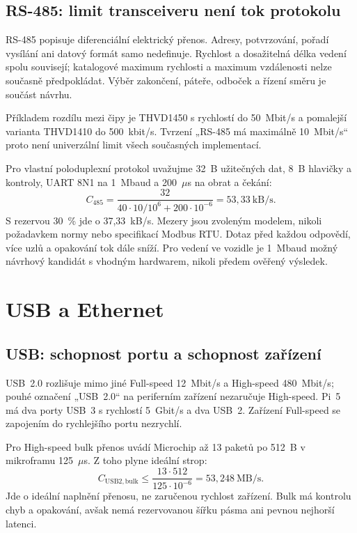 \documentclass[11pt,a4paper]{article}
\begin{document}
\subsection{RS-485: limit transceiveru není tok protokolu}
RS-485 popisuje diferenciální elektrický přenos. Adresy, potvrzování, pořadí vysílání ani datový formát samo nedefinuje. Rychlost a dosažitelná délka vedení spolu souvisejí; katalogové maximum rychlosti a maximum vzdálenosti nelze současně předpokládat. Výběr zakončení, páteře, odboček a řízení směru je součást návrhu.\cite{rs485}

Příkladem rozdílu mezi čipy je THVD1450 s rychlostí do 50~Mbit/s a pomalejší varianta THVD1410 do 500~kbit/s.\cite{thvd} Tvrzení „RS-485 má maximálně 10~Mbit/s“ proto není univerzální limit všech současných implementací.

Pro vlastní poloduplexní protokol uvažujme 32~B užitečných dat, 8~B hlavičky a kontroly, UART 8N1 na 1~Mbaud a 200~$\mu$s na obrat a čekání:
\begin{equation}
C_{\mathrm{485}}=\frac{32}{40\cdot10/10^6+200\cdot10^{-6}}
=53{,}33~\mathrm{kB/s}.
\end{equation}
S rezervou 30~\% jde o 37,33~kB/s. Mezery jsou zvoleným modelem, nikoli požadavkem normy nebo specifikací Modbus RTU. Dotaz před každou odpovědí, více uzlů a opakování tok dále sníží. Pro vedení ve vozidle je 1~Mbaud možný návrhový kandidát s vhodným hardwarem, nikoli předem ověřený výsledek.

\section{USB a Ethernet}
\label{sec:usb}
\subsection{USB: schopnost portu a schopnost zařízení}
USB~2.0 rozlišuje mimo jiné Full-speed 12~Mbit/s a High-speed 480~Mbit/s; pouhé označení „USB~2.0“ na periferním zařízení nezaručuje High-speed.\cite{usb2,usbhs} Pi~5 má dva porty USB~3 s rychlostí 5~Gbit/s a dva USB~2.\cite{pi5} Zařízení Full-speed se zapojením do rychlejšího portu nezrychlí.

Pro High-speed bulk přenos uvádí Microchip až 13 paketů po 512~B v mikroframu 125~$\mu$s. Z toho plyne ideální strop:
\begin{equation}
C_{\mathrm{USB2,bulk}}\le\frac{13\cdot512}{125\cdot10^{-6}}
=53{,}248~\mathrm{MB/s}.
\end{equation}
Jde o ideální naplnění přenosu, ne zaručenou rychlost zařízení.\cite{usbhs} Bulk má kontrolu chyb a opakování, avšak nemá rezervovanou šířku pásma ani pevnou nejhorší latenci.\cite{usbbulk}
\end{document}
